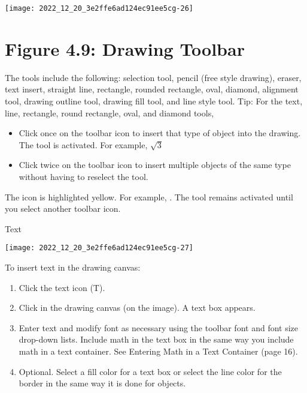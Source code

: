 \begin{center}
\texttt{[image: 2022\_12\_20\_3e2ffe6ad124ec91ee5cg-26]}
\end{center}

\section{Figure 4.9: Drawing Toolbar}
The tools include the following: selection tool, pencil (free style drawing), eraser, text insert, straight line, rectangle, rounded rectangle, oval, diamond, alignment tool, drawing outline tool, drawing fill tool, and line style tool. Tip: For the text, line, rectangle, round rectangle, oval, and diamond tools,

\begin{itemize}
  \item Click once on the toolbar icon to insert that type of object into the drawing. The tool is activated. For example, $\sqrt{3}$

  \item Click twice on the toolbar icon to insert multiple objects of the same type without having to reselect the tool.

\end{itemize}

The icon is highlighted yellow. For example, . The tool remains activated until you select another toolbar icon.

Text

\begin{center}
\texttt{[image: 2022\_12\_20\_3e2ffe6ad124ec91ee5cg-27]}
\end{center}

To insert text in the drawing canvas:

\begin{enumerate}
  \item Click the text icon (T).

  \item Click in the drawing canvas (on the image). A text box appears.

  \item Enter text and modify font as necessary using the toolbar font and font size drop-down lists. Include math in the text box in the same way you include math in a text container. See Entering Math in a Text Container (page 16).

  \item Optional. Select a fill color for a text box or select the line color for the border in the same way it is done for objects.

\end{enumerate}

